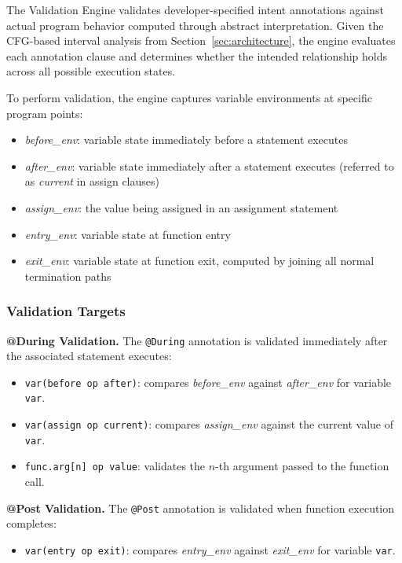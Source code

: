 \documentclass[pdflatex,sn-basic]{sn-jnl}%
\theoremstyle{thmstyleone}%
\theoremstyle{thmstyletwo}%
\theoremstyle{thmstylethree}%
\begin{document}
The Validation Engine validates developer-specified intent annotations against actual program behavior computed through abstract interpretation.
Given the CFG-based interval analysis from Section~\ref{sec:architecture}, the engine evaluates each annotation clause and determines whether the intended relationship holds across all possible execution states.

To perform validation, the engine captures variable environments at specific program points:
\begin{itemize}
    \item \textit{before\_env}: variable state immediately before a statement executes
    \item \textit{after\_env}: variable state immediately after a statement executes (referred to as \textit{current} in assign clauses)
    \item \textit{assign\_env}: the value being assigned in an assignment statement
    \item \textit{entry\_env}: variable state at function entry
    \item \textit{exit\_env}: variable state at function exit, computed by joining all normal termination paths
\end{itemize}

\subsubsection{Validation Targets}
\noindent\textbf{@During Validation.}
The \texttt{@During} annotation is validated immediately after the associated statement executes:
\begin{itemize}
    \item \texttt{var(before op after)}: compares \textit{before\_env} against \textit{after\_env} for variable \texttt{var}.

    \item \texttt{var(assign op current)}: compares \textit{assign\_env} against the current value of \texttt{var}.

    \item \texttt{func.arg[n] op value}: validates the $n$-th argument passed to the function call.
\end{itemize}

\smallskip
\noindent\textbf{@Post Validation.}
The \texttt{@Post} annotation is validated when function execution completes:
\begin{itemize}
    \item \texttt{var(entry op exit)}: compares \textit{entry\_env} against \textit{exit\_env} for variable \texttt{var}.
\end{itemize}
\end{document}

